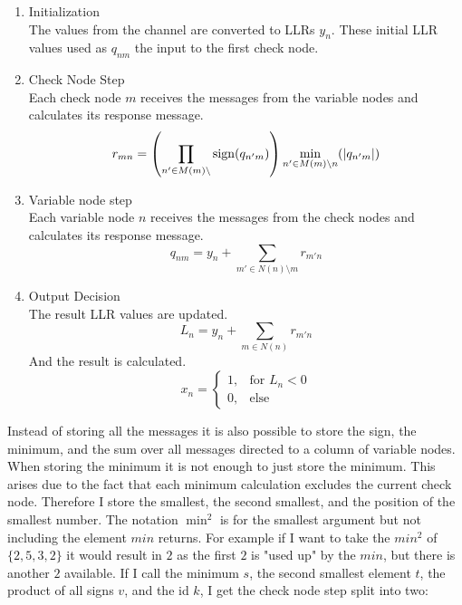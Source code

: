 \begin{enumerate}
\item{Initialization}\\
The values from the channel are converted to LLRs $y_n$. These initial LLR values used as $q_{nm}$ the input to the first check node.

\item{Check Node Step}\\
Each check node $m$ receives the messages from the variable nodes and calculates its response message.
\begin{equation}
    r_{mn} = \left( \prod_{n' \in M(m)\setminus }\operatorname{sign}(q_{n'm}) \right) \min_{n' \in M(m) \setminus n}(\left|q_{n'm}\right|)
\end{equation}

\item{Variable node step}\\
Each variable node $n$ receives the messages from the check nodes and calculates its response message.
\begin{equation}
    q_{nm} = y_n + \sum_{m' \in N(n)\setminus m}r_{m'n}
\end{equation}

\item{Output Decision}\\
The result LLR values are updated.
\begin{equation}
    L_n = y_n + \sum_{m \in N(n)}r_{m'n}
\end{equation}
And the result is calculated.
\begin{equation}
    x_n = \begin{cases}
        1, & \text{for } L_n < 0 \\
        0, & \text{else}
    \end{cases}
\end{equation}

\end{enumerate}

Instead of storing all the messages it is also possible to store the sign, the minimum, and the sum over all messages directed to a column of variable nodes. When storing the minimum it is not enough to just store the minimum. This arises due to the fact that each minimum calculation excludes the current check node. Therefore I store the smallest, the second smallest, and the position of the smallest number. The notation $\min^2$ is for the smallest argument but not including the element $min$ returns. For example if I want to take the $min^2$ of $\{2, 5, 3, 2\}$ it would result in $2$ as the first $2$ is "used up" by the $min$, but there is another $2$ available. If I call the minimum $s$, the second smallest element $t$, the product of all signs $v$, and the id $k$, I get the check node step split into two:


